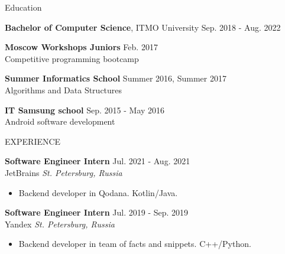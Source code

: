 \documentclass{resume} %
\begin{document}

\begin{rSection}{Education}

{\bf Bachelor of Computer Science}, ITMO University \hfill {Sep. 2018 - Aug. 2022}

{\bf Moscow Workshops Juniors} \hfill {Feb. 2017}\\
Competitive programming bootcamp

{\bf Summer Informatics School} \hfill {Summer 2016, Summer 2017}\\
Algorithms and Data Structures

{\bf IT Samsung school} \hfill {Sep. 2015 - May 2016}\\
Android software development


\end{rSection}


\begin{rSection}{EXPERIENCE}

\textbf{Software Engineer Intern} \hfill Jul. 2021 - Aug. 2021\\
JetBrains \hfill \textit{St. Petersburg, Russia}
 \begin{itemize}
    \itemsep -3pt {} 
     \item Backend developer in Qodana. Kotlin/Java.
 \end{itemize}
 
\textbf{Software Engineer Intern} \hfill Jul. 2019 - Sep. 2019\\
Yandex \hfill \textit{St. Petersburg, Russia}
 \begin{itemize}
    \itemsep -3pt {} 
     \item Backend developer in team of facts and snippets. C++/Python.
 \end{itemize}

\end{rSection} 
\end{document}
